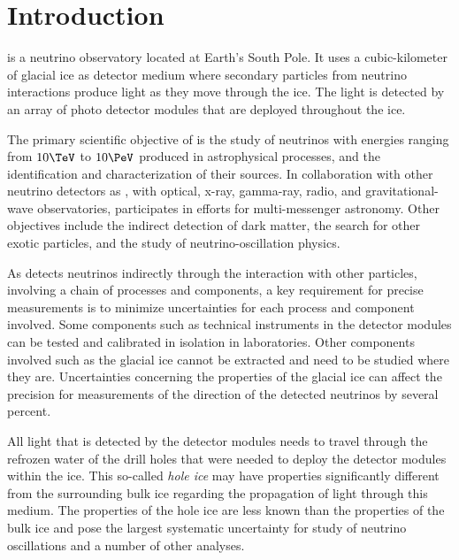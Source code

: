
\section{Introduction}
\label{sec:intro}

\icecube is a neutrino observatory located at Earth's South Pole.
It uses a cubic-kilometer of glacial ice as detector medium where secondary particles from neutrino interactions produce light as they move through the ice. The light is detected by an array of photo detector modules that are deployed throughout the ice. \cite{evidence2013}

The primary scientific objective of \icecube is the study of neutrinos with energies ranging from $10\TeV$ to $10\PeV$ produced in astrophysical processes, and the identification and characterization of their sources. In collaboration with other neutrino detectors as , with optical, x-ray, gamma-ray, radio, and gravitational-wave observatories, \icecube participates in efforts for multi-messenger astronomy. Other objectives include the indirect detection of dark matter, the search for other exotic particles, and the study of neutrino-oscillation physics. \cite{instrumentation, evidence2013}

As \icecube detects neutrinos indirectly through the interaction with other particles, involving a chain of processes and components, a key requirement for precise measurements is to minimize uncertainties for each process and component involved. Some components such as technical instruments in the detector modules can be tested and calibrated in isolation in laboratories. Other components involved such as the glacial ice cannot be extracted and need to be studied where they are. Uncertainties concerning the properties of the glacial ice can affect the precision for measurements of the direction of the detected neutrinos by several percent. \cite{wrede}

All light that is detected by the detector modules needs to travel through the refrozen water of the drill holes that were needed to deploy the detector modules within the ice. This so-called \textit{hole ice} may have properties significantly different from the surrounding bulk ice regarding the propagation of light through this medium. The properties of the hole ice are less known than the properties of the bulk ice and pose the largest systematic uncertainty for study of neutrino oscillations and a number of other analyses. \cite{icrc17pocam}

